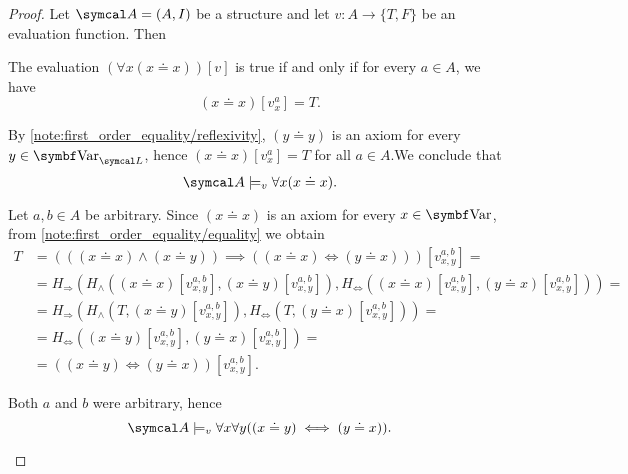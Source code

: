 \begin{proof}
  Let \( \Cal{A} = (A, I) \) be a structure and let \( v: A \to \{ T, F \} \) be an evaluation function. Then

  \begin{description}
     The evaluation \( (\forall x (x \doteq x))[v] \) is true if and only if for every \( a \in A \), we have
    \begin{equation*}
      (x \doteq x)[v_x^a] = T.
    \end{equation*}

    By \cref{note:first_order_equality/reflexivity}, \( (y \doteq y) \) is an axiom for every \( y \in \Bold{Var}_{\Cal{L}} \), hence \mbox{\( (x \doteq x)[v_x^a] = T \)} for all \( a \in A \).We conclude that
    \begin{equation*}
      \Cal{A} \models_v \forall x (x \doteq x).
    \end{equation*}

     Let \( a, b \in A \) be arbitrary. Since \( (x \doteq x) \) is an axiom for every \( x \in \Bold{Var} \), from \cref{note:first_order_equality/equality} we obtain
    \begin{align*}
      T &=
      (((x \doteq x) \land (x \doteq y)) \implies ((x \doteq x) \iff (y \doteq x)))[v_{x,y}^{a,b}]
      = \\ &=
      H_\Rightarrow(H_\land((x \doteq x)[v_{x,y}^{a,b}], (x \doteq y)[v_{x,y}^{a,b}]), H_\Leftrightarrow((x \doteq x)[v_{x,y}^{a,b}], (y \doteq x)[v_{x,y}^{a,b}]))
      = \\ &=
      H_\Rightarrow(H_\land(T, (x \doteq y)[v_{x,y}^{a,b}]), H_\Leftrightarrow(T, (y \doteq x)[v_{x,y}^{a,b}]))
      = \\ &=
      H_\Leftrightarrow((x \doteq y)[v_{x,y}^{a,b}], (y \doteq x)[v_{x,y}^{a,b}])
      = \\ &=
      ((x \doteq y) \iff (y \doteq x))[v_{x,y}^{a,b}].
    \end{align*}

    Both \( a \) and \( b \) were arbitrary, hence
    \begin{equation*}
      \Cal{A} \models_v \forall x \forall y ((x \doteq y) \iff (y \doteq x)).
    \end{equation*}


\end{description}
\end{proof}
